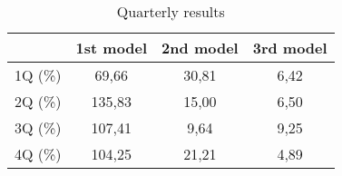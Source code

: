 \newpage
\begin{table}[h!]
    \begin{center}
        \begin{tabular}{ | l | c | c | c |}
            \hline
            & \textbf{1st model} & \textbf{2nd model} & \textbf{3rd model}\\
            \hline
            1Q (\%) & 69,66 & 30,81 & 6,42\\
            2Q (\%) & 135,83 & 15,00 & 6,50\\
            3Q (\%) & 107,41 & 9,64 & 9,25\\
            4Q (\%) & 104,25 & 21,21 & 4,89\\
            \hline
        \end{tabular}
    \end{center}
    \caption{Quarterly results}
    \label{qResults}
\end{table}
\newpage
